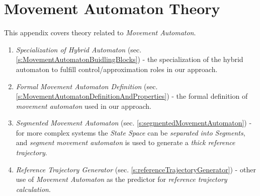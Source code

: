 \cleardoublepage

\chapter{Movement Automaton Theory}
\noindent This appendix covers theory related to \emph{Movement Automaton}.

\begin{enumerate}
	\item \emph{Specialization of Hybrid Automaton} (sec. \ref{s:MovementAutomatonBuidlingBlocks}) - the specialization of the hybrid automaton to fulfill control/approximation roles in our approach.
	
	\item \emph{Formal Movement Automaton Definition} (sec. \ref{s:MovementAutomatonDefinitionAndProperties}) - the formal definition of \emph{movement automaton} used in our approach.
    
    \item \emph{Segmented Movement Automaton} (sec. \ref{s:segmentedMovementAutomaton}) - for more complex systems the \emph{State Space} can be \emph{separated into Segments}, and \emph{segment movement automaton} is used to generate a \emph{thick reference trajectory}.
    
    \item \emph{Reference Trajectory Generator} (sec. \ref{s:referenceTrajectoryGenerator}) - other use of \emph{Movement Automaton} as the predictor for \emph{reference trajectory calculation}.
\end{enumerate}